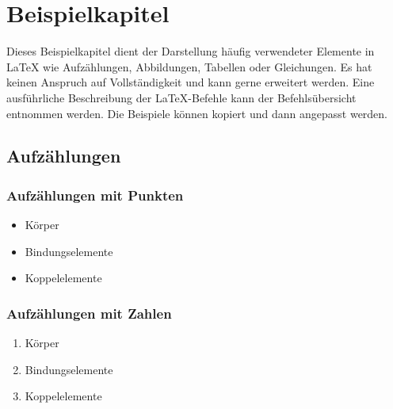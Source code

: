 \chapter*{Beispielkapitel}  %
\label{cha:beispielkapitel} %
Dieses Beispielkapitel dient der Darstellung häufig verwendeter Elemente in LaTeX wie Aufzählungen, Abbildungen, Tabellen oder Gleichungen. Es hat keinen Anspruch auf Vollständigkeit und kann gerne erweitert werden. Eine ausführliche Beschreibung der LaTeX-Befehle kann der Befehlsübersicht entnommen werden.
Die Beispiele können kopiert und dann angepasst werden.


\section*{Aufzählungen} %
\label{sec:aufzaehlungen}

\subsection*{Aufzählungen mit Punkten}
\label{aufzaehlung_punkte}

\begin{itemize}
    \item Körper
    \item Bindungselemente
    \item Koppelelemente
\end{itemize}

\subsection{Aufzählungen mit Zahlen} %
\label{aufzaehlung_zaheln}

\begin{enumerate}
    \item Körper
    \item Bindungselemente
    \item Koppelelemente
\end{enumerate}

\cleardoublepage


